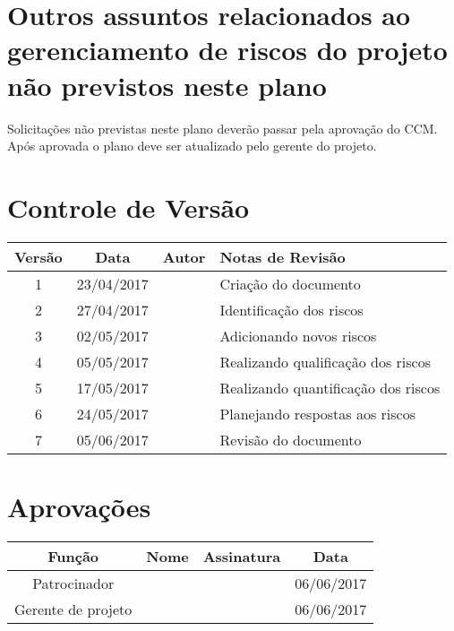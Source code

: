 \section{Outros assuntos relacionados ao gerenciamento de riscos do projeto não previstos neste plano}

Solicitações não previstas neste plano deverão passar pela aprovação do CCM. Após aprovada o plano deve ser atualizado pelo gerente do projeto.

\section{Controle de Versão}

\begin{table}[H]
	\begin{tabularx}{\textwidth}{| c | c | X | X |}
		\hline
		\textbf{Versão} & \textbf{Data} & \textbf{Autor}        & \textbf{Notas de Revisão} \\
		\hline
		1                &    23/04/2017           & \projectManagerName{} & Criação do documento     \\
		\hline
		2                &    27/04/2017           & \projectManagerName{} & Identificação dos riscos     \\
		\hline
		3                &    02/05/2017           & \projectManagerName{} & Adicionando novos riscos     \\
		\hline
		4                &    05/05/2017           & \projectManagerName{} & Realizando qualificação dos riscos     \\
		\hline
		5                &    17/05/2017           & \projectManagerName{} & Realizando quantificação dos riscos      \\
		\hline
		6                &    24/05/2017           & \projectManagerName{} & Planejando respostas aos riscos     \\
		\hline
		7                &    05/06/2017           & \projectManagerName{} & Revisão do documento     \\
		\hline
	\end{tabularx}
	\centering
\end{table}

\section{Aprovações}

\begin{table}[H]
	\begin{tabularx}{\textwidth}{| c | c | X | c |}
		\hline
		\textbf{Função}  & \textbf{Nome}         & \textbf{Assinatura}        & \textbf{Data} \\
		\hline
		Patrocinador       & \projectSponsorName{} & \projectSponsorSignature{} &      06/06/2017         \\
		\hline
		Gerente de projeto & \projectManagerName{} & \projectManagerSignature{} &      06/06/2017         \\
		\hline
	\end{tabularx}
	\centering
\end{table}